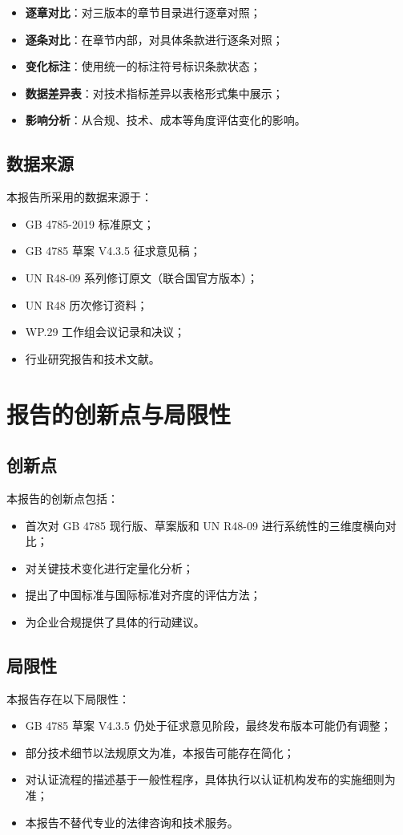 \begin{itemize}[leftmargin=2em]
    \item \textbf{逐章对比}：对三版本的章节目录进行逐章对照；
    \item \textbf{逐条对比}：在章节内部，对具体条款进行逐条对照；
    \item \textbf{变化标注}：使用统一的标注符号标识条款状态；
    \item \textbf{数据差异表}：对技术指标差异以表格形式集中展示；
    \item \textbf{影响分析}：从合规、技术、成本等角度评估变化的影响。
\end{itemize}

\subsection{数据来源}

本报告所采用的数据来源于：

\begin{itemize}[itemsep=0.3em]
    \item GB 4785-2019 标准原文；
    \item GB 4785 草案 V4.3.5 征求意见稿；
    \item UN R48-09 系列修订原文（联合国官方版本）；
    \item UN R48 历次修订资料；
    \item WP.29 工作组会议记录和决议；
    \item 行业研究报告和技术文献。
\end{itemize}

\section{报告的创新点与局限性}

\subsection{创新点}

本报告的创新点包括：

\begin{itemize}[itemsep=0.3em]
    \item 首次对 GB 4785 现行版、草案版和 UN R48-09 进行系统性的三维度横向对比；
    \item 对关键技术变化进行定量化分析；
    \item 提出了中国标准与国际标准对齐度的评估方法；
    \item 为企业合规提供了具体的行动建议。
\end{itemize}

\subsection{局限性}

本报告存在以下局限性：

\begin{itemize}[itemsep=0.3em]
    \item GB 4785 草案 V4.3.5 仍处于征求意见阶段，最终发布版本可能仍有调整；
    \item 部分技术细节以法规原文为准，本报告可能存在简化；
    \item 对认证流程的描述基于一般性程序，具体执行以认证机构发布的实施细则为准；
    \item 本报告不替代专业的法律咨询和技术服务。
\end{itemize}